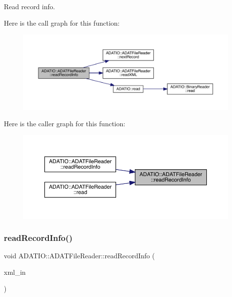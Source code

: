 Read record info. 

Here is the call graph for this function\+:\nopagebreak
\begin{figure}[H]
\begin{center}
\leavevmode
\includegraphics[width=350pt]{db/de5/group__qio_gade5b9d659e34ec9c9de267858a675d7d_cgraph}
\end{center}
\end{figure}
Here is the caller graph for this function\+:\nopagebreak
\begin{figure}[H]
\begin{center}
\leavevmode
\includegraphics[width=350pt]{db/de5/group__qio_gade5b9d659e34ec9c9de267858a675d7d_icgraph}
\end{center}
\end{figure}
\mbox{\label{group__qio_ga4d771a46d7db77cd0ae5999113733795}} 
\subsubsection{\texorpdfstring{readRecordInfo()}{readRecordInfo()}\hspace{0.1cm}{\footnotesize\ttfamily [2/2]}}
{\footnotesize\ttfamily void A\+D\+A\+T\+I\+O\+::\+A\+D\+A\+T\+File\+Reader\+::read\+Record\+Info (\begin{DoxyParamCaption}\item[{\mbox{\hyperlink{classADATXML_1_1XMLReader}{X\+M\+L\+Reader}} \&}]{xml\+\_\+in }\end{DoxyParamCaption})\hspace{0.3cm}{\ttfamily [protected]}}



